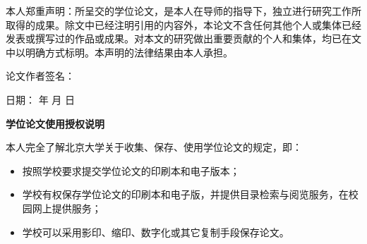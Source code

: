 \documentclass[12pt, a4paper]{ctexart}
\begin{document}
本人郑重声明：所呈交的学位论文，是本人在导师的指导下，独立进行研究工作所取得的成果。除文中已经注明引用的内容外，本论文不含任何其他个人或集体已经发表或撰写过的作品或成果。对本文的研究做出重要贡献的个人和集体，均已在文中以明确方式标明。本声明的法律结果由本人承担。

\vspace{4em} %

\hfill 论文作者签名： 

\vspace{2em} %

\hfill 日期： 年  月  日

\vspace{2em} %

\begin{center}
    \textbf{学位论文使用授权说明}
\end{center}

\vspace{1em} %

本人完全了解北京大学关于收集、保存、使用学位论文的规定，即：
\begin{itemize}
    \item 按照学校要求提交学位论文的印刷本和电子版本；
    \item 学校有权保存学位论文的印刷本和电子版，并提供目录检索与阅览服务，在校园网上提供服务；
    \item 学校可以采用影印、缩印、数字化或其它复制手段保存论文。
\end{itemize}
\end{document}

